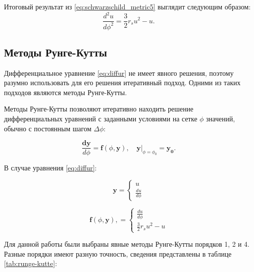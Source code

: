 Итоговый результат из \eqref{eq:schwarzschild_metric5} выглядит следующим образом:
\begin{equation}
\label{eq:diffur}
    \frac{d^2u}{d\phi^2} = \frac{3}{2}r_su^2 - u.
\end{equation}

\subsection{Методы Рунге-Кутты}
\label{subsec:runge-kutte}

Дифференциальное уравнение \eqref{eq:diffur} не имеет явного решения, поэтому разумно использовать для его решения итеративный подход. Одними из таких подходов являются методы Рунге-Кутты.

Методы Рунге-Кутты позволяют итеративно находить решение дифференциальных уравнений с заданными условиями на сетке $\phi$ значений, обычно с постоянным шагом $\Delta \phi$:

\begin{equation}
\label{eq:runge-kutte}
    \frac{\mathbf{dy}}{d\phi} = \mathbf{f}(\phi, \mathbf{y}),
    \quad
    \left.\mathbf{y}\right|_{\phi=\phi_0}=\mathbf{y_0}.
\end{equation}

В случае уравнения \eqref{eq:diffur}:

\begin{equation*}
\label{eq:runge-kutte_y}
    \mathbf{y} =
    \begin{cases}
        u
        \\
        \frac{du}{d\phi}
    \end{cases}
\end{equation*}

\begin{equation*}
\label{eq:runge-kutte_f}
    \mathbf{f}(\phi, \mathbf{y}), =
    \begin{cases}
        \frac{du}{d\phi}
        \\
        \frac{3}{2}r_su^2 - u
    \end{cases}
\end{equation*}

Для данной работы были выбраны явные методы Рунге-Кутты порядков 1, 2 и 4. Разные порядки имеют разную точность, сведения представлены в таблице \ref{tab:runge-kutte}:

